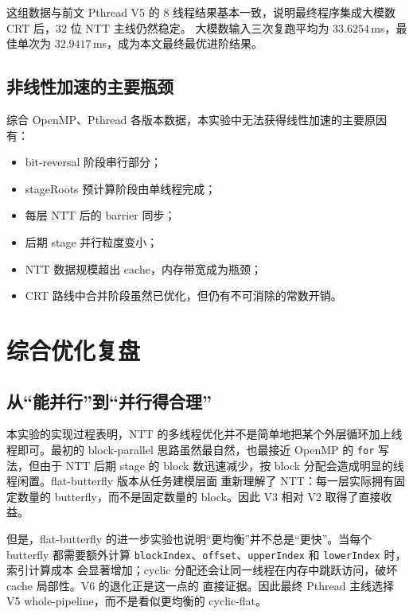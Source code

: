 \documentclass[UTF8,a4paper,10pt]{ctexart}
\begin{document}
这组数据与前文 Pthread V5 的 8 线程结果基本一致，说明最终程序集成大模数 CRT 后，32 位 NTT 主线仍然稳定。
大模数输入三次复跑平均为 $33.6254$\,ms，最佳单次为 $32.9417$\,ms，成为本文最终最优进阶结果。

\subsection{非线性加速的主要瓶颈}

综合 OpenMP、Pthread 各版本数据，本实验中无法获得线性加速的主要原因有：

\begin{itemize}
  \item bit-reversal 阶段串行部分；
  \item stageRoots 预计算阶段由单线程完成；
  \item 每层 NTT 后的 barrier 同步；
  \item 后期 stage 并行粒度变小；
  \item NTT 数据规模超出 cache，内存带宽成为瓶颈；
  \item CRT 路线中合并阶段虽然已优化，但仍有不可消除的常数开销。
\end{itemize}



\section{综合优化复盘}

\subsection{从“能并行”到“并行得合理”}

本实验的实现过程表明，NTT 的多线程优化并不是简单地把某个外层循环加上线程即可。最初的
block-parallel 思路虽然最自然，也最接近 OpenMP 的 \texttt{for} 写法，但由于 NTT 后期 stage
的 block 数迅速减少，按 block 分配会造成明显的线程闲置。flat-butterfly 版本从任务建模层面
重新理解了 NTT：每一层实际拥有固定数量的 butterfly，而不是固定数量的 block。因此 V3 相对 V2
取得了直接收益。

但是，flat-butterfly 的进一步实验也说明“更均衡”并不总是“更快”。当每个 butterfly 都需要额外计算
\texttt{blockIndex}、\texttt{offset}、\texttt{upperIndex} 和 \texttt{lowerIndex} 时，索引计算成本
会显著增加；cyclic 分配还会让同一线程在内存中跳跃访问，破坏 cache 局部性。V6 的退化正是这一点的
直接证据。因此最终 Pthread 主线选择 V5 whole-pipeline，而不是看似更均衡的 cyclic-flat。
\end{document}
